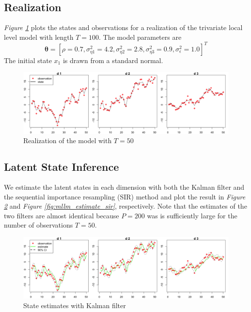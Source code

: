 \documentclass[11pt, oneside]{scrreprt}   	%
\begin{document}
\subsection{Realization}
\textit{Figure \ref{fig:mllm_realization}} plots the states and observations for a realization of the trivariate local level model with length $T=100$. The model parameters are 
$$
\boldsymbol{\theta} = [\rho = 0.7, \sigma_{\eta 1}^2 = 4.2, \sigma_{\eta 2}^2 = 2.8, \sigma_{\eta 3}^2 = 0.9, \sigma_{\epsilon}^2 = 1.0]^T
$$
The initial state $x_1$ is drawn from a standard normal.

\begin{figure}[h!]
\centering
\includegraphics[width=155mm]{../../images/mllm-realization-v2.png}
\caption{Realization of the model with $T=50$}
\label{fig:mllm_realization}
\end{figure}

\subsection{Latent State Inference}
We estimate the latent states in each dimension with both the Kalman filter and the sequential importance resampling (SIR) method and plot the result in \textit{Figure \ref{fig:mllm_estimate_kalman}} and \textit{Figure \ref{fig:mllm_estimate_sir}}, respectively. Note that the estimates of the two filters are almost identical because $P=200$ was is sufficiently large for the number of observations $T=50$.\\

\begin{figure}[h!]
\centering
\includegraphics[width=155mm]{../../images/mllm-estimate-kalman.png}
\caption{State estimates with Kalman filter}
\label{fig:mllm_estimate_kalman}
\end{figure}
\end{document}
